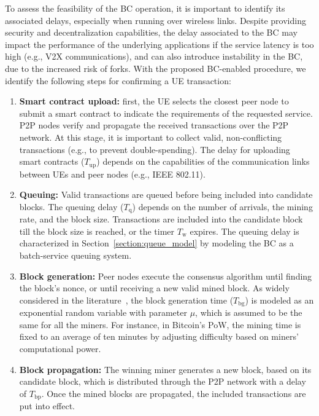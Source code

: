 \documentclass[conference]{IEEEtran}
\theoremstyle{definition}
\begin{document}
To assess the feasibility of the BC operation, it is important to identify its associated delays, especially when running over wireless links. Despite providing security and decentralization capabilities, the delay associated to the BC may impact the performance of the underlying applications if the service latency is too high (e.g., V2X communications), and can also introduce instability in the BC, due to the increased risk of forks. With the proposed BC-enabled procedure, we identify the following steps for confirming a UE transaction: 
\begin{enumerate}
    \item \textbf{Smart contract upload:} first, the UE selects the closest peer node to submit a smart contract to indicate the requirements of the requested service. P2P nodes verify and propagate the received transactions over the P2P network. At this stage, it is important to collect valid, non-conflicting transactions (e.g., to prevent double-spending). The delay for uploading smart contracts ($T_\text{up}$) depends on the capabilities of the communication links between UEs and peer nodes (e.g., IEEE 802.11).
    \item \textbf{Queuing:} Valid transactions are queued before being included into candidate blocks. The queuing delay ($T_\text{q}$) depends on the number of arrivals, the mining rate, and the block size. Transactions are included into the candidate block till the block size is reached, or the timer $T_\text{w}$ expires. The queuing delay is characterized in Section~\ref{section:queue_model} by modeling the BC as a batch-service queuing system. 
    \item \textbf{Block generation:} Peer nodes execute the consensus algorithm until finding the block's nonce, or until receiving a new valid mined block. As widely considered in the literature~\cite{decker2013information, biais2019blockchain}, the block generation time ($T_\text{bg}$) is modeled as an exponential random variable with parameter $\mu$, which is assumed to be the same for all the miners. For instance, in Bitcoin's PoW, the mining time is fixed to an average of ten minutes by adjusting difficulty based on miners' computational power.
    \item \textbf{Block propagation:} The winning miner generates a new block, based on its candidate block, which is distributed through the P2P network with a delay of $T_\text{bp}$. Once the mined blocks are propagated, the included transactions are put into effect.
\end{enumerate}
\end{document}
